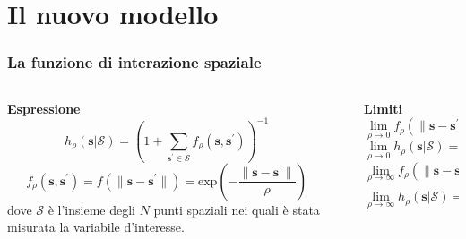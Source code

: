 \section{Il nuovo modello}

\begin{frame}
	\frametitle{La funzione di interazione spaziale}
	\centering
	
	\begin{columns}[T]
		
		\begin{column}[t]{0.48\linewidth}
			\textbf{Espressione}
			\begin{equation*}
				h_\rho(\mathbf{s}|\mathcal{S}) = \left(1 + \sum_{\mathbf{s}^\prime\in\mathcal{S}}f_\rho(\mathbf{s}, \mathbf{s}^\prime)\right)^{-1}
			\end{equation*}
			\begin{equation*}
				f_\rho(\mathbf{s}, \mathbf{s}^\prime) = f(\| \mathbf{s} - \mathbf{s}^\prime \|) = \text{exp}\left(-\frac{\|\mathbf{s} - \mathbf{s}^\prime\|}{\rho}\right)
			\end{equation*}
			\justifying
			dove $\mathcal{S}$ è l'insieme degli $N$ punti spaziali nei quali è stata misurata la variabile d'interesse.
		\end{column}
		
		\begin{column}{.02\textwidth}
			\rule{.1mm}{0.7\textheight}
		\end{column}
	
		\begin{column}[t]{0.48\linewidth}
			\textbf{Limiti}
			\begin{equation*}
				\lim\limits_{\rho\to 0} f_\rho(\| \mathbf{s} - \mathbf{s}^\prime \|) = 0
			\end{equation*}
			\begin{equation*}
				\lim\limits_{\rho\to 0} h_\rho(\mathbf{s}|\mathcal{S}) = 1
			\end{equation*}
			\begin{equation*}
				\lim\limits_{\rho\to\infty} f_\rho(\| \mathbf{s} - \mathbf{s}^\prime \|) = 1
			\end{equation*}
			\begin{equation*}
				\lim\limits_{\rho\to\infty} h_\rho(\mathbf{s}|\mathcal{S}) = \frac{1}{N+1}
			\end{equation*}
		\end{column}
	\end{columns}
\end{frame}

